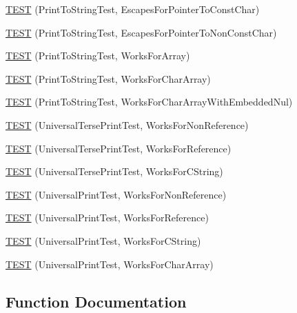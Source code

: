 \begin{DoxyCompactItemize}
\item 
\hyperlink{namespacetesting_1_1gtest__printers__test_ab8fce4287e837cfcd851ded56b62f9ce}{T\+E\+ST} (Print\+To\+String\+Test, Escapes\+For\+Pointer\+To\+Const\+Char)
\item 
\hyperlink{namespacetesting_1_1gtest__printers__test_a7203081ef422f0835643d2c54b8ebf28}{T\+E\+ST} (Print\+To\+String\+Test, Escapes\+For\+Pointer\+To\+Non\+Const\+Char)
\item 
\hyperlink{namespacetesting_1_1gtest__printers__test_a78bd89af8a8505880b78ec2a001d3cb8}{T\+E\+ST} (Print\+To\+String\+Test, Works\+For\+Array)
\item 
\hyperlink{namespacetesting_1_1gtest__printers__test_ad122dc21e7ebad023d7048ef117a1129}{T\+E\+ST} (Print\+To\+String\+Test, Works\+For\+Char\+Array)
\item 
\hyperlink{namespacetesting_1_1gtest__printers__test_a65e208358dddc7747f4519410c71d877}{T\+E\+ST} (Print\+To\+String\+Test, Works\+For\+Char\+Array\+With\+Embedded\+Nul)
\item 
\hyperlink{namespacetesting_1_1gtest__printers__test_ab49ff6527b0b01411b725fe46e1af65c}{T\+E\+ST} (Universal\+Terse\+Print\+Test, Works\+For\+Non\+Reference)
\item 
\hyperlink{namespacetesting_1_1gtest__printers__test_ab7adb58a0e08e0830157a5a1c7bceac5}{T\+E\+ST} (Universal\+Terse\+Print\+Test, Works\+For\+Reference)
\item 
\hyperlink{namespacetesting_1_1gtest__printers__test_ab11252e228a240a349d747546bc222d2}{T\+E\+ST} (Universal\+Terse\+Print\+Test, Works\+For\+C\+String)
\item 
\hyperlink{namespacetesting_1_1gtest__printers__test_a43d4efc91c2ea7d8220891df9b0437df}{T\+E\+ST} (Universal\+Print\+Test, Works\+For\+Non\+Reference)
\item 
\hyperlink{namespacetesting_1_1gtest__printers__test_a58ad7c81884e852b09646764ce14a47e}{T\+E\+ST} (Universal\+Print\+Test, Works\+For\+Reference)
\item 
\hyperlink{namespacetesting_1_1gtest__printers__test_ac20aca012aca1ca9589dbf7483fbbbd1}{T\+E\+ST} (Universal\+Print\+Test, Works\+For\+C\+String)
\item 
\hyperlink{namespacetesting_1_1gtest__printers__test_a23a9eda97679bfc29c87b8de17cc35bf}{T\+E\+ST} (Universal\+Print\+Test, Works\+For\+Char\+Array)
\end{DoxyCompactItemize}


\subsection{Function Documentation}
